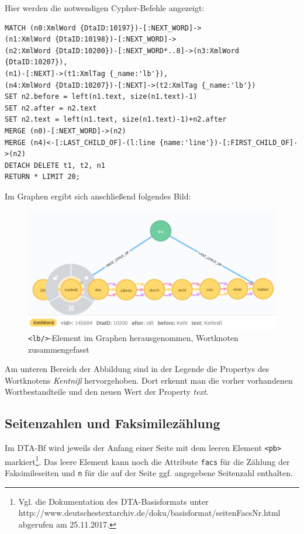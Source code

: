 \documentclass[ngerman,]{scrreprt}
\begin{document}
Hier werden die notwendigen Cypher-Befehle angezeigt:

\begin{verbatim}
MATCH (n0:XmlWord {DtaID:10197})-[:NEXT_WORD]->
(n1:XmlWord {DtaID:10198})-[:NEXT_WORD]->
(n2:XmlWord {DtaID:10200})-[:NEXT_WORD*..8]->(n3:XmlWord {DtaID:10207}),
(n1)-[:NEXT]->(t1:XmlTag {_name:'lb'}),
(n4:XmlWord {DtaID:10207})-[:NEXT]->(t2:XmlTag {_name:'lb'})
SET n2.before = left(n1.text, size(n1.text)-1)
SET n2.after = n2.text
SET n2.text = left(n1.text, size(n1.text)-1)+n2.after
MERGE (n0)-[:NEXT_WORD]->(n2)
MERGE (n4)<-[:LAST_CHILD_OF]-(l:line {name:'line'})-[:FIRST_CHILD_OF]->(n2)
DETACH DELETE t1, t2, n1
RETURN * LIMIT 20;
\end{verbatim}

Im Graphen ergibt sich anschließend folgendes Bild:

\begin{figure}
\centering
\includegraphics{Bilder/TEI2Graph/lb-Trennung-rausgenommen2.png}
\caption{\texttt{\textless{}lb/\textgreater{}}-Element im Graphen herausgenommen, Wortknoten zusammengefasst}
\end{figure}

Am unteren Bereich der Abbildung sind in der Legende die Propertys des Wortknotens \emph{Kentniß} hervorgehoben. Dort erkennt man die vorher vorhandenen Wortbestandteile und den neuen Wert der Property \emph{text}.

\subsection{Seitenzahlen und Faksimilezählung}\label{seitenzahlen-und-faksimilezuxe4hlung}

Im DTA-Bf wird jeweils der Anfang einer Seite mit dem leeren Element \texttt{\textless{}pb\textgreater{}} markiert\footnote{Vgl. die Dokumentation des DTA-Basisformats unter http://www.deutschestextarchiv.de/doku/basisformat/seitenFacsNr.html abgerufen am 25.11.2017.}. Das leere Element kann noch die Attribute \texttt{facs} für die Zählung der Faksimileseiten und \texttt{n} für die auf der Seite ggf. angegebene Seitenzahl enthalten.
\end{document}
